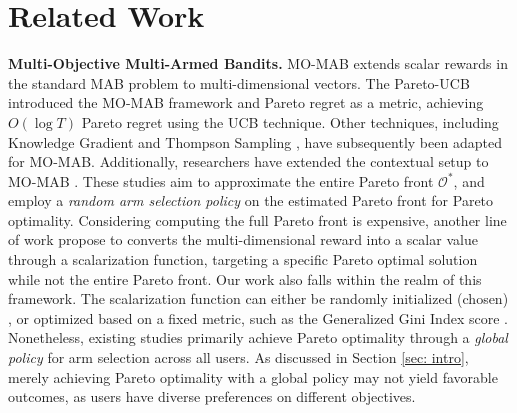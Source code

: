 \vspace{-8pt}
\section{Related Work}
\textbf{Multi-Objective Multi-Armed Bandits.} 
MO-MAB extends scalar rewards in the standard MAB problem to multi-dimensional vectors. 
The Pareto-UCB \cite{drugan2013designing} introduced the MO-MAB framework and Pareto regret as a metric, achieving $O(\log T)$ Pareto regret using the UCB technique.
Other techniques, including Knowledge Gradient \cite{yahyaa2014knowledge} and Thompson Sampling \cite{yahyaa2015thompson}, have subsequently been adapted for MO-MAB.
Additionally, researchers have extended the contextual setup to MO-MAB \cite{turgay2018multi, lu2019multi}. 
These studies aim to approximate the entire Pareto front 
$\mathcal{O}^*$, and employ a \emph{random arm selection policy} on the estimated Pareto front for Pareto optimality.
Considering computing the full Pareto front is expensive, another line of work propose to converts the multi-dimensional reward into a scalar value through a scalarization function, targeting a specific Pareto optimal solution while not the entire Pareto front. Our work also falls within the realm of this framework.
The scalarization function can either be randomly initialized (chosen) \cite{drugan2013designing, xu2023pareto}, or optimized based on a fixed metric, such as the Generalized Gini Index score \cite{busa2017multi, mehrotra2020bandit}.
Nonetheless, existing studies primarily achieve Pareto optimality through a \emph{global policy} for arm selection across all users. 
As discussed in Section \ref{sec: intro}, merely achieving Pareto optimality with a global policy may not yield favorable outcomes, as users have diverse preferences on different objectives. 


